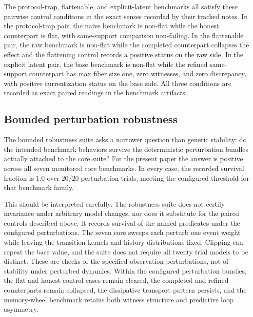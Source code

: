 \documentclass[11pt]{article}
\theoremstyle{definition}
\begin{document}
The protocol-trap, flattenable, and explicit-latent benchmarks all satisfy these pairwise control conditions in the exact senses recorded by their tracked notes. In the protocol-trap pair, the naive benchmark is non-flat while the honest counterpart is flat, with same-support comparison non-failing. In the flattenable pair, the raw benchmark is non-flat while the completed counterpart collapses the effect and the flattening control records a positive status on the raw side. In the explicit latent pair, the base benchmark is non-flat while the refined same-support counterpart has max fiber size one, zero witnesses, and zero discrepancy, with positive currentization status on the base side. All three conditions are recorded as exact paired readings in the benchmark artifacts.

\subsection{Bounded perturbation robustness}\label{subsec:controls-robustness}
The bounded robustness suite asks a narrower question than generic stability: do the intended benchmark behaviors survive the deterministic perturbation bundles actually attached to the core suite? For the present paper the answer is positive across all seven monitored core benchmarks. In every case, the recorded survival fraction is $1.0$ over $20/20$ perturbation trials, meeting the configured threshold for that benchmark family.

This should be interpreted carefully. The robustness suite does not certify invariance under arbitrary model changes, nor does it substitute for the paired controls described above. It records survival of the named predicates under the configured perturbations. The seven core sweeps each perturb one event weight while leaving the transition kernels and history distributions fixed. Clipping can repeat the base value, and the suite does not require all twenty trial models to be distinct. These are checks of the specified observation perturbations, not of stability under perturbed dynamics. Within the configured perturbation bundles, the flat and honest-control cases remain cleared, the completed and refined counterparts remain collapsed, the dissipative transport pattern persists, and the memory-wheel benchmark retains both witness structure and predictive loop asymmetry.
\end{document}
